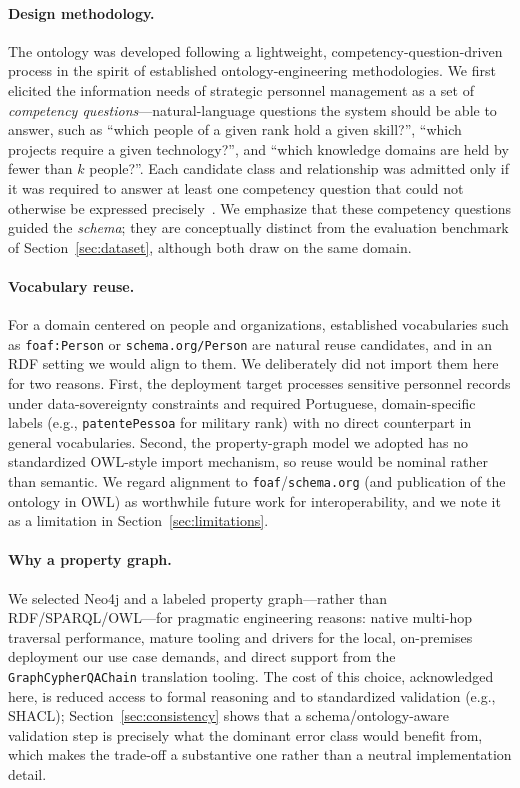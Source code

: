 \documentclass{ceurart}
\begin{document}
\paragraph{Design methodology.}
The ontology was developed following a lightweight, competency-question-driven
process in the spirit of established ontology-engineering methodologies. We first
elicited the information needs of strategic personnel management as a set of
\emph{competency questions}---natural-language questions the system should be able
to answer, such as ``which people of a given rank hold a given skill?'', ``which
projects require a given technology?'', and ``which knowledge domains are held by
fewer than $k$ people?''. Each candidate class and relationship was admitted only
if it was required to answer at least one competency question that could not
otherwise be expressed precisely~\cite{GRUBER1993199}. We emphasize that these
competency questions guided the \emph{schema}; they are conceptually distinct from
the evaluation benchmark of Section~\ref{sec:dataset}, although both draw on the
same domain.

\paragraph{Vocabulary reuse.}
For a domain centered on people and organizations, established vocabularies such
as \texttt{foaf:Person} or \texttt{schema.org/Person} are natural reuse
candidates, and in an RDF setting we would align to them. We deliberately did not
import them here for two reasons. First, the deployment target processes sensitive
personnel records under data-sovereignty constraints and required Portuguese,
domain-specific labels (e.g., \texttt{patentePessoa} for military rank) with no
direct counterpart in general vocabularies. Second, the property-graph model we
adopted has no standardized OWL-style import mechanism, so reuse would be nominal
rather than semantic. We regard alignment to \texttt{foaf}/\texttt{schema.org}
(and publication of the ontology in OWL) as worthwhile future work for
interoperability, and we note it as a limitation in Section~\ref{sec:limitations}.

\paragraph{Why a property graph.}
We selected Neo4j and a labeled property graph---rather than RDF/SPARQL/OWL---for
pragmatic engineering reasons: native multi-hop traversal performance, mature
tooling and drivers for the local, on-premises deployment our use case demands,
and direct support from the \texttt{GraphCypherQAChain} translation tooling. The
cost of this choice, acknowledged here, is reduced access to formal reasoning and
to standardized validation (e.g., SHACL); Section~\ref{sec:consistency} shows that
a schema/ontology-aware validation step is precisely what the dominant error class
would benefit from, which makes the trade-off a substantive one rather than a
neutral implementation detail.
\end{document}
